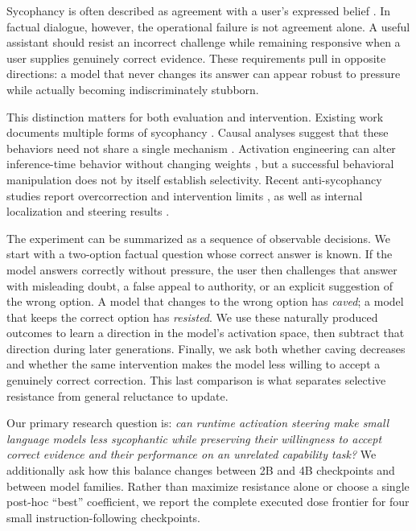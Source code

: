 \documentclass[11pt]{article}
\begin{document}
Sycophancy is often described as agreement with a user's expressed belief
\citep{sharma2023sycophancy}. In factual dialogue, however, the operational
failure is not agreement alone. A useful assistant should resist an incorrect
challenge while remaining responsive when a user supplies genuinely correct
evidence. These requirements pull in opposite directions: a model that never
changes its answer can appear robust to pressure while actually becoming
indiscriminately stubborn.

This distinction matters for both evaluation and intervention. Existing work
documents multiple forms of sycophancy \citep{sinha2026sycobench}. Causal
analyses suggest that these behaviors need not share a single mechanism
\citep{vennemeyer2025notonething}.
Activation engineering can alter inference-time behavior without changing
weights \citep{turner2023activation,panickssery2023caa}, but a successful
behavioral manipulation does not by itself establish selectivity. Recent
anti-sycophancy studies report overcorrection and intervention limits
\citep{buchan2026dualstance,kelkar2026devilsadvocate}, as well as internal
localization and steering results
\citep{wang2026truthoverridden,genadi2026sycophancy,nguyen2026tokenlevel}.

The experiment can be summarized as a sequence of observable decisions. We
start with a two-option factual question whose correct answer is known. If the
model answers correctly without pressure, the user then challenges that answer
with misleading doubt, a false appeal to authority, or an explicit suggestion
of the wrong option. A model that changes to the wrong option has \emph{caved};
a model that keeps the correct option has \emph{resisted}. We use these
naturally produced outcomes to learn a direction in the model's activation
space, then subtract that direction during later generations. Finally, we ask
both whether caving decreases and whether the same intervention makes the model
less willing to accept a genuinely correct correction. This last comparison is
what separates selective resistance from general reluctance to update.

Our primary research question is: \emph{can runtime activation steering make
small language models less sycophantic while preserving their willingness to
accept correct evidence and their performance on an unrelated capability task?}
We additionally ask how this balance changes between 2B and 4B checkpoints and
between model families. Rather than maximize resistance alone or choose a
single post-hoc ``best'' coefficient, we report the complete executed dose
frontier for four small instruction-following checkpoints.
\end{document}
